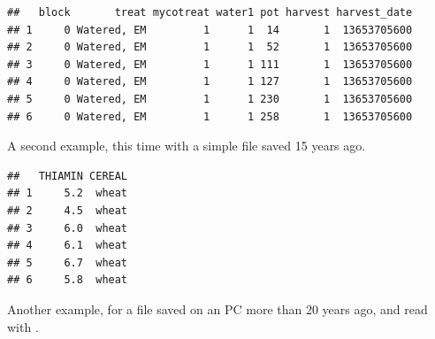 \documentclass[krantz2]{krantz}\usepackage{knitr}%
\begin{document}
\begin{knitrout}\footnotesize
{}\color{fgcolor}\begin{kframe}
\begin{alltt}
 \hlkwb{<-} \hlstd{(} \hlstd{=} \hlstd{,}  \hlstd{=} \hlstd{)}
\end{alltt}


{\ttfamily\noindent\itshape\color{messagecolor}{\#\# re-encoding from UTF-8}}\begin{alltt}
\hlstd{my_spss.df[}\hlopt{:}\hlstd{,} \hlstd{(}\hlopt{:}\hlstd{,} \hlstd{)]}
\end{alltt}
\begin{verbatim}
##   block       treat mycotreat water1 pot harvest harvest_date
## 1     0 Watered, EM         1      1  14       1  13653705600
## 2     0 Watered, EM         1      1  52       1  13653705600
## 3     0 Watered, EM         1      1 111       1  13653705600
## 4     0 Watered, EM         1      1 127       1  13653705600
## 5     0 Watered, EM         1      1 230       1  13653705600
## 6     0 Watered, EM         1      1 258       1  13653705600
\end{verbatim}
\end{kframe}
\end{knitrout}

A second example, this time with a simple  file saved 15 years ago.

\begin{knitrout}\footnotesize
{}\color{fgcolor}\begin{kframe}
\begin{alltt}
 \hlkwb{<-} \hlstd{(} \hlstd{=} \hlstd{,}  \hlstd{=} \hlstd{)}
\end{alltt}
\begin{verbatim}
##   THIAMIN CEREAL
## 1     5.2  wheat
## 2     4.5  wheat
## 3     6.0  wheat
## 4     6.1  wheat
## 5     6.7  wheat
## 6     5.8  wheat
\end{verbatim}
\end{kframe}
\end{knitrout}

Another example, for a  file saved on an PC more than 20 years ago, and read with .
\end{document}
